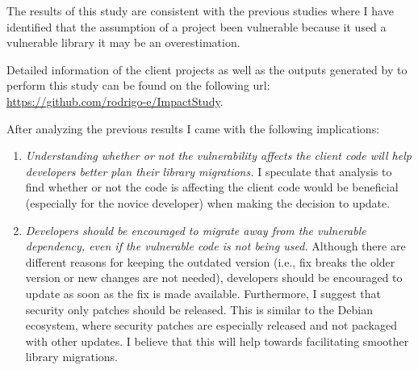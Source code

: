 The results of this study are consistent with the previous studies where I have identified that the assumption of a project been vulnerable because it used a vulnerable library it may be an overestimation.

Detailed information of the client projects as well as the outputs generated by \tool[] to perform this study can be found on the following url: \url{https://github.com/rodrigo-e/ImpactStudy}.

After analyzing the previous results I came with the following implications:
\begin{enumerate}
    \item \textit{Understanding whether or not the vulnerability affects the client code will help developers better plan their library migrations.}
    I speculate that analysis to find whether or not the code is affecting the client code would be beneficial (especially for the novice developer) when making the decision to update. 

    \item \textit{Developers should be encouraged to migrate away from the vulnerable dependency, even if the vulnerable code is not being used.}
    Although there are different reasons for keeping the outdated version (i.e., fix breaks the older version or new changes are not needed), developers should be encouraged to update as soon as the fix is made available.
    Furthermore, I suggest that security only patches should be released.
    This is similar to the Debian ecosystem, where security patches are especially released and not packaged with other updates.
    I believe that this will help towards facilitating smoother library migrations.
\end{enumerate}